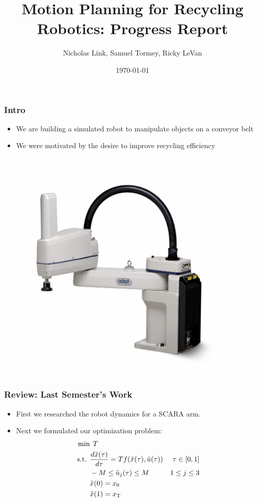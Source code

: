 \documentclass{beamer}
\title[Recycle Robot]{Motion Planning for Recycling Robotics: Progress Report} %
\author[Link, Tormey, LeVan]{Nicholas Link, Samuel Tormey, Ricky LeVan} %
\date{\today} %
\newcommand{\ut}[1]{\ensuremath{\tilde{#1}}}
\begin{document}
\begin{frame}
\titlepage %

\end{frame}

\begin{frame}
\frametitle{Intro}
\begin{itemize}
\item We are building a simulated robot to manipulate objects on a conveyor belt
\item We were motivated by the desire to improve recycling efficiency
\end{itemize}
\begin{centering}
\includegraphics[width=0.55\linewidth,height=0.55\textheight,keepaspectratio]{scara.jpg}

\end{centering}

\end{frame}


\begin{frame}
\frametitle{Review: Last Semester's Work}
\begin{itemize}
\item First we researched the robot dynamics for a SCARA arm.

\item Next we formulated our optimization problem:
\begin{align*}
\min  & \: \:T \\
\mbox{s.t. } & \frac{d\ut{x}(\tau)}{d\tau} = Tf(\ut{x}(\tau),\ut{u}(\tau))  &\tau \in [0,1] \\
& -M \leq \ut{u}_j(\tau) \leq M  & 1 \leq j \leq 3 \\
& \ut{x}(0) = x_0 \\
& \ut{x}(1) = x_{\scriptsize\mbox{T}} 
\end{align*}

\end{itemize}

\end{frame}
\end{document}
